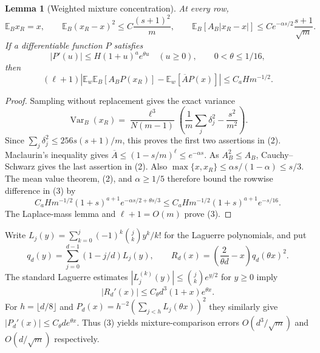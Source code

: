 \documentclass[11pt]{article}
\newtheorem{lemma}{Lemma}
\newcommand{\E}{\mathbb E}
\begin{document}
\begin{lemma}[Weighted mixture concentration]\label{mix}
At every row,
\[
 \E_B x_R=x,\qquad
 \E_B(x_R-x)^2\le C\frac{(s+1)^2}{m},\qquad
 \E_B[A_B|x_R-x|]\le C e^{-\alpha s/2}\frac{s+1}{\sqrt m}.
\tag{2}
\]
If a differentiable function $P$ satisfies
\[
 |P'(u)|\le H(1+u)^a e^{\theta u}\quad(u\ge0),
 \qquad 0<\theta\le1/16,
\]
then
\[
 (\ell+1)\left|\E_w\E_B[A_BP(x_R)]-
                  \E_w[\overline A P(x)]\right|
 \le C_a Hm^{-1/2}.                               \tag{3}
\]
\end{lemma}
\begin{proof}
Sampling without replacement gives the exact variance
\[
 \operatorname{Var}_B(x_R)=
 \frac{\ell^3}{N(m-1)}
 \left(\frac1m\sum_j\delta_j^2-\frac{s^2}{m^2}\right).
\]
Since $\sum_j\delta_j^2\le256s(s+1)/m$, this proves the first two
assertions in (2). Maclaurin's inequality gives
$\overline A\le(1-s/m)^\ell\le e^{-\alpha s}$.
As $A_B^2\le A_B$, Cauchy--Schwarz gives the last assertion in (2).
Also $\max\{x,x_R\}\le\alpha s/(1-\alpha)\le s/3$.
The mean value theorem, (2), and $\alpha\ge1/5$ therefore bound the
rowwise difference in (3) by
\[
 C_a Hm^{-1/2}(1+s)^{a+1}
 e^{-\alpha s/2+\theta s/3}
 \le C_a Hm^{-1/2}(1+s)^{a+1}e^{-s/16}.
\]
The Laplace-mass lemma and $\ell+1=O(m)$ prove (3).
\end{proof}

Write $L_j(y)=\sum_{k=0}^j(-1)^k\binom jk y^k/k!$ for the
Laguerre polynomials, and put
\[
 q_d(y)=\sum_{j=0}^{d-1}(1-j/d)L_j(y),\qquad
 R_d(x)=\left(\frac2{\theta d}-x\right)q_d(\theta x)^2.
\]
The standard Laguerre estimates $|L_j^{(k)}(y)|\le\binom jk e^{y/2}$
for $y\ge0$ imply
\[
 |R_d'(x)|\le C_\theta d^3(1+x)e^{\theta x}.
\tag{4}
\]
For $h=\lfloor d/8\rfloor$ and
$P_d(x)=h^{-2}(\sum_{j<h}L_j(\theta x))^2$ they similarly give
$|P_d'(x)|\le C_\theta d e^{\theta x}$.
Thus (3) yields mixture-comparison errors $O(d^3/\sqrt m)$ and
$O(d/\sqrt m)$ respectively.
\end{document}

